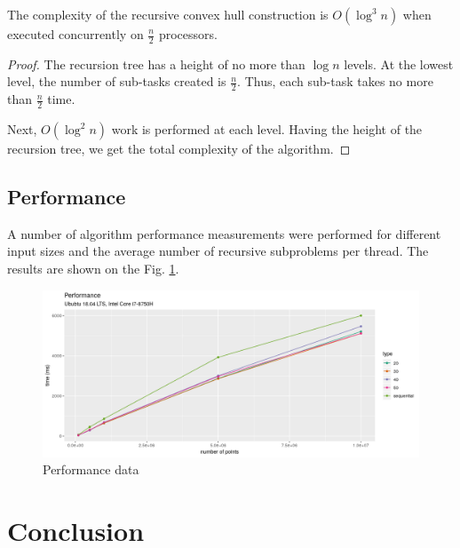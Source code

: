 \documentclass[a4paper,english,numberwithinsect,notab]{eurocg20-submission}
\begin{document}
	\begin{theorem}
		The complexity of the recursive convex hull construction is $O(\log^3n)$ when executed concurrently on $\frac{n}{2}$ processors.
	\end{theorem}
	
	\begin{proof}
		The recursion tree has a height of no more than $\log n$ levels. At the lowest level, the number of sub-tasks created is $\frac{n}{2}$. Thus, each sub-task takes no more than $\frac{n}{2}$ time.
		
		Next, $O(\log^2 n)$ work is performed at each level. Having the height of the recursion tree, we get the total complexity of the algorithm.
	\end{proof}	


\subsection{Performance}



	A number of algorithm performance measurements were performed for different input sizes and the average number of recursive subproblems per thread. The results are shown on the Fig. \ref{fig:performance}.
	
	\begin{figure}[h]
		\centering
		\includegraphics[width=1\textwidth, height=0.4\textheight]{performance}
		\caption{Performance data}
		\label{fig:performance}
	\end{figure}


\section{Conclusion}
\label{sec:coclusion}
\end{document}
